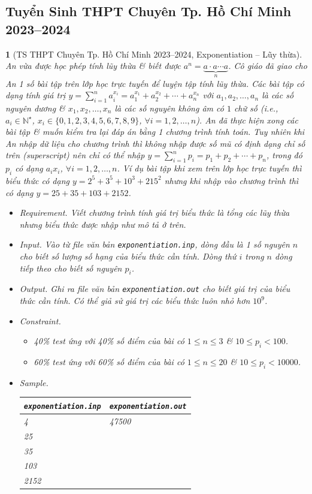 \documentclass{article}
\newtheorem{baitoan}{}
\begin{document}
\subsection{Tuyển Sinh THPT Chuyên Tp. Hồ Chí Minh 2023--2024}

\begin{baitoan}[TS THPT Chuyên Tp. Hồ Chí Minh 2023--2024, Exponentiation -- Lũy thừa]
	An vừa được học phép tính lũy thừa \& biết được $a^n = \underbrace{a\cdot a\cdots a}_n$. Cô giáo đã giao cho An 1 số bài tập trên lớp học trực tuyến để luyện tập tính lũy thừa. Các bài tập có dạng tính giá trị $y = \sum_{i=1}^n a_i^{x_i} = a_1^{x_1} + a_2^{x_2} + \cdots + a_n^{x_n}$ với $a_1,a_2,\ldots,a_n$ là các số nguyên dương \& $x_1,x_2,\ldots,x_n$ là các số nguyên không âm có $1$ chữ số (i.e., $a_i\in\mathbb{N}^\star$, $x_i\in\{0,1,2,3,4,5,6,7,8,9\}$, $\forall i = 1,2,\ldots,n$). An đã thực hiện xong các bài tập \& muốn kiểm tra lại đáp án bằng 1 chương trình tính toán. Tuy nhiên khi An nhập dữ liệu cho chương trình thì không nhập được số mũ có định dạng chỉ số trên (superscript) nên chỉ có thể nhập $y = \sum_{i=1}^n p_i = p_1 + p_2 + \cdots + p_n$, trong đó $p_i$ có dạng $a_ix_i$, $\forall i = 1,2,\ldots,n$. Ví dụ bài tập khi xem trên lớp học trực tuyến thì biểu thức có dạng $y = 2^5 + 3^5 + 10^3 + 215^2$ nhưng khi nhập vào chương trình thì có dạng $y = 25 + 35 +103 + 2152$.
	\begin{itemize}
		\item {\sf Requirement.} Viết chương trình tính giá trị biểu thức là tổng các lũy thừa nhưng biểu thức được nhập như mô tả ở trên.
		\item {\sf Input.} Vào từ file văn bản {\tt exponentiation.inp}, dòng đầu là 1 số nguyên $n$ cho biết số lượng số hạng của biểu thức cần tính. Dòng thứ $i$ trong $n$ dòng tiếp theo cho biết số nguyên $p_i$.
		\item {\sf Output.} Ghi ra file văn bản {\tt exponentiation.out} cho biết giá trị của biểu thức cần tính. Có thể giả sử giá trị các biểu thức luôn nhỏ hơn $10^9$.
		\item {\sf Constraint.}
		\begin{itemize}
			\item {\rm40\%} test ứng với {\rm40\%} số điểm của bài có $1\le n\le3$ \& $10\le p_i < 100$.
			\item {\rm60\%} test ứng với {\rm60\%} số điểm của bài có $1\le n\le20$ \& $10\le p_i < 10000$.
		\end{itemize}
		\item {\sf Sample.}
		\begin{table}[H]
			\centering
			\begin{tabular}{|l|l|}
				\hline
				\texttt{exponentiation.inp} & \texttt{exponentiation.out} \\
				\hline
				4 & 47500 \\
				25 &  \\
				35 &  \\
				103 &  \\
				2152 &  \\
				\hline
			\end{tabular}
		\end{table}
	\end{itemize}
\end{baitoan}
\end{document}
